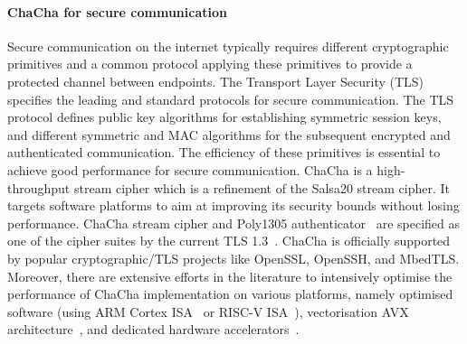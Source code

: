 \paragraph{ChaCha for secure communication}
Secure communication on the internet typically requires different cryptographic primitives and a common protocol applying these primitives to provide a protected channel between endpoints.
The Transport Layer Security (TLS) specifies the leading and standard protocols for secure communication.
The TLS protocol defines public key algorithms for establishing symmetric session keys, and different symmetric and MAC algorithms for the subsequent encrypted and authenticated communication.
The efficiency of these primitives is essential to achieve good performance for secure communication.
ChaCha is a high-throughput stream cipher which is a refinement of the Salsa20 stream cipher. It targets software platforms to aim at improving its security bounds without losing performance. ChaCha stream cipher and Poly1305 authenticator~\cite{RFC:16} are specified as one of the cipher suites by the current TLS 1.3~\cite[Section 9.1]{RFC:18:8446}.
ChaCha is officially supported by popular cryptographic/TLS projects like OpenSSL, OpenSSH, and MbedTLS.
Moreover, there are extensive efforts in the literature to intensively optimise the performance of ChaCha implementation on various platforms, namely optimised software (using ARM Cortex ISA~\cite{SSS:17} or RISC-V ISA~\cite{Sto:19}), vectorisation AVX architecture~\cite{GolGue:14}, and dedicated hardware accelerators~\cite{KLA:19,PRH:19}.  

